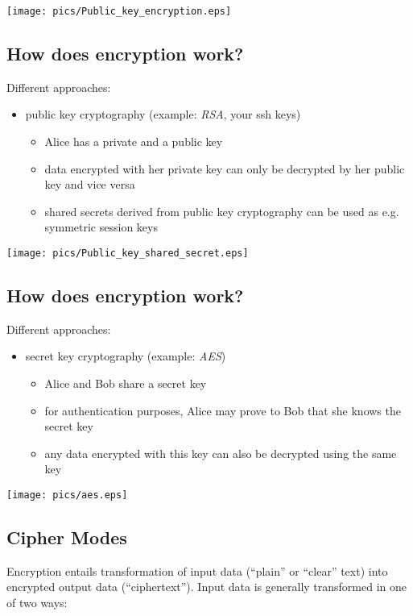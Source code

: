\documentclass[xga]{xdvislides}
\begin{document}
\begin{center}
	\texttt{[image: pics/Public\_key\_encryption.eps]}
 \end{center}


\subsection{How does encryption work?}
Different approaches:
\begin{itemize}
	\item public key cryptography (example: {\em RSA}, your ssh keys)
		\begin{itemize}
			\item Alice has a private and a public key
			\item data encrypted with her private key can only be decrypted by
				her public key and vice versa
			\item shared secrets derived from public key cryptography can be used as e.g. symmetric session keys
		\end{itemize}
\end{itemize}

\begin{center}
	\texttt{[image: pics/Public\_key\_shared\_secret.eps]}
 \end{center}

\subsection{How does encryption work?}
Different approaches:
\begin{itemize}
	\item secret key cryptography (example: {\em AES})
		\begin{itemize}
			\item Alice and Bob share a secret key
			\item for authentication purposes, Alice may prove
				to Bob that she knows the secret key
			\item any data encrypted with this key
				can also be decrypted using the same key
		\end{itemize}
\end{itemize}

 \begin{center}
        \texttt{[image: pics/aes.eps]}
 \end{center}

\subsection{Cipher Modes}
Encryption entails transformation of input data (``plain''
or ``clear'' text) into encrypted output data
(``ciphertext'').  Input data is generally transformed
in one of two ways:
\\
\end{document}

